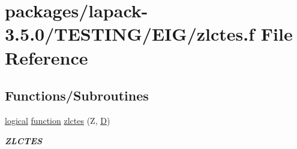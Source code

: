 \hypertarget{zlctes_8f}{}\section{packages/lapack-\/3.5.0/\+T\+E\+S\+T\+I\+N\+G/\+E\+I\+G/zlctes.f File Reference}
\label{zlctes_8f}
\subsection*{Functions/\+Subroutines}
\begin{DoxyCompactItemize}
\item 
\hyperlink{tnc_8c_aa7b64cdf39500931f7b333343791a104}{logical} \hyperlink{afunc_8m_a7b5e596df91eadea6c537c0825e894a7}{function} \hyperlink{group__complex16__eig_ga070d0aa3531da9c4cf1187ddacfadc04}{zlctes} (Z, \hyperlink{odrpack_8h_a7dae6ea403d00f3687f24a874e67d139}{D})
\begin{DoxyCompactList}\small\item\em {\bfseries Z\+L\+C\+T\+E\+S} \end{DoxyCompactList}\end{DoxyCompactItemize}
